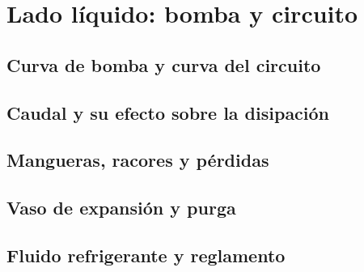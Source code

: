 \chapter{Lado líquido: bomba y circuito}
\label{ch:lado_liquido}

\begin{objetivos}
  \item {}
  \item {}
  \item {}
\end{objetivos}


\section{Curva de bomba y curva del circuito}
\label{sec:lado_liquido:01}

\section{Caudal y su efecto sobre la disipación}
\label{sec:lado_liquido:02}

\section{Mangueras, racores y pérdidas}
\label{sec:lado_liquido:03}

\section{Vaso de expansión y purga}
\label{sec:lado_liquido:04}

\section{Fluido refrigerante y reglamento}
\label{sec:lado_liquido:05}


